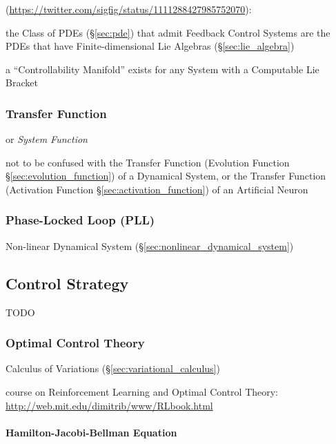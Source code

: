 (\url{https://twitter.com/sigfig/status/1111288427985752070}):

the Class of PDEs (\S\ref{sec:pde}) that admit Feedback Control Systems are the
PDEs that have Finite-dimensional Lie Algebras (\S\ref{sec:lie_algebra})

a ``Controllability Manifold'' exists for any System with a Computable Lie
Bracket



\subsubsection{Transfer Function}\label{sec:transfer_function}

or \emph{System Function}

not to be confused with the Transfer Function (Evolution Function
\S\ref{sec:evolution_function}) of a Dynamical System, or the Transfer Function
(Activation Function \S\ref{sec:activation_function}) of an Artificial Neuron



\subsubsection{Phase-Locked Loop (PLL)}\label{sec:pll}

Non-linear Dynamical System (\S\ref{sec:nonlinear_dynamical_system})



\subsection{Control Strategy}\label{sec:control_strategy}

TODO



\subsubsection{Optimal Control Theory}\label{sec:optimal_control}

\fist Calculus of Variations (\S\ref{sec:variational_calculus})

course on Reinforcement Learning and Optimal Control Theory:
\url{http://web.mit.edu/dimitrib/www/RLbook.html}



\paragraph{Hamilton-Jacobi-Bellman Equation}
\label{sec:hamilton_jacobi_bellman}\hfill

